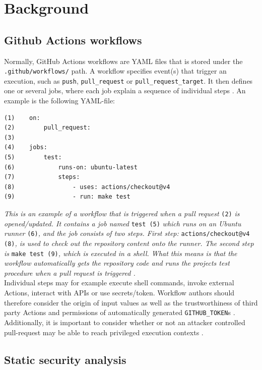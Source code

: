 \documentclass{article}
\begin{document}
\section{Background}

\subsection{Github Actions workflows}

Normally, GitHub Actions workflows are YAML files that is stored under the \texttt{.github/workflows/} path. A workflow specifies event(s) that trigger an execution, such as \texttt{push}, \texttt{pull\_request} or \texttt{pull\_request\_target}. It then defines one or several jobs, where each job explain a sequence of individual steps \cite{githubactions}. An example is the following YAML-file: 

\begin{verbatim}
(1)    on: 
(2)        pull_request:
(3)
(4)    jobs:
(5)        test:
(6)            runs-on: ubuntu-latest
(7)            steps:
(8)                - uses: actions/checkout@v4
(9)                - run: make test
\end{verbatim} 

\textit{This is an example of a workflow that is triggered when a pull request} \texttt{(2)} \textit{is opened/updated. It contains a job named} \texttt{test (5)} \textit{which runs on an Ubuntu runner} \texttt{(6)}\textit{, and the job consists of two steps. First step:} \texttt{actions/checkout@v4 (8)}\textit{, is used to check out the repository content onto the runner. The second step is}  \texttt{make test (9)}\textit{, which is executed in a shell. What this means is that the workflow automatically gets the repository code and runs the projects test procedure when a pull request is triggered \cite{githubactions}.} \\

Individual steps may for example execute shell commands, invoke external Actions, interact with APIs or use secrets/token. Workflow authors should therefore consider the origin of input values as well as the trustworthiness of third party Actions and permissions of automatically generated \texttt{GITHUB\_TOKEN}s \cite{githubsecurity}. Additionally, it is important to consider whether or not an attacker controlled pull-request may be able to reach privileged execution contexts \cite{githubprtarget}. 

\subsection{Static security analysis}
\end{document}
